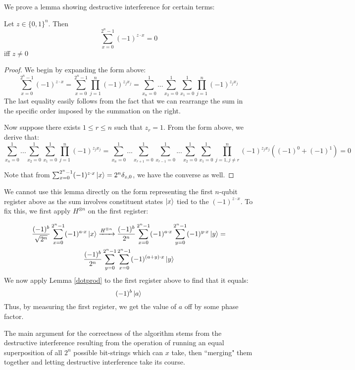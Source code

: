 \documentclass{../quantum.tex}
\begin{document}
We prove a lemma showing destructive interference for certain terms: \newline

\begin{lemma} \label{dotprod}
  Let $z \in \{0,1\}^n$. Then
  $$\sum_{x=0}^{2^n-1} (-1)^{z \cdot x} = 0$$ iff $z \neq 0$
\end{lemma}
\begin{proof}
   We begin by expanding the form above:
   $$\sum_{x=0}^{2^n-1} (-1)^{z \cdot x} = \sum_{x=0}^{2^n -1}\prod_{j=1}^n (-1)^{z_jx_j} = \sum_{x_n = 0}^1...\sum_{x_2 = 0}^1\sum_{x_1 = 0}^1 \prod_{j=1}^n (-1)^{z_jx_j}   $$
   The last equality easily follows from the fact that we can rearrange the sum in the specific order imposed by the summation on the right.

   Now suppose there exists $1 \leq r \leq n$ such that $z_r = 1$. From the form above, we derive that:
   $$\sum_{x_n = 0}^1...\sum_{x_2 = 0}^1\sum_{x_1 = 0}^1 \prod_{j=1}^n (-1)^{z_jx_j} = \sum_{x_n = 0}^1...\sum_{x_{r+1} = 0}^1\sum_{x_{r-1} = 0}^1... \sum_{x_2 = 0}^1\sum_{x_1 = 0}^1 \prod_{j=1,j \neq r}^n (-1)^{z_jx_j} ((-1)^0 + (-1)^1) = 0 $$

   Note that from $\sum_{x=0}^{2^n-1} (-1)^{z \cdot x} \ket{x} = 2^n\delta_{z,0}$, we have the converse as well.
\end{proof}

We cannot use this lemma directly on the form representing the first $n$-qubit register above as the sum involves constituent states $\ket{x}$ tied to the $(-1)^{z\cdot x}$. To fix this, we first apply $H^{\otimes n}$ on the first register:

\begin{gather}
  \frac{(-1)^b}{\sqrt{2^n}} \sum_{x=0}^{2^n-1}(-1)^{a\cdot x}\ket{x} \xrightarrow{H^{\otimes n}} \frac{(-1)^b}{2^n}\sum_{x=0}^{2^n -1}  (-1)^{a\cdot x} \sum_{y=0}^{2^n -1} (-1)^{y \cdot x} \ket{y} = \\
  \frac{(-1)^b}{2^n}\sum_{y=0}^{2^n -1} \sum_{x=0}^{2^n -1} (-1)^{(a+y)\cdot x} \ket{y}
\end{gather}
%
We now apply Lemma \ref{dotprod} to the first register above to find that it equals:
$$(-1)^b \ket{a} $$ Thus, by measuring the first register, we get the value of $a$ off by some phase factor.

The main argument for the correctness of the algorithm stems from the destructive interference resulting from the operation of running an equal superposition of all $2^n$ possible bit-strings which can $x$ take, then ``merging" them together and letting destructive interference take its course.
\end{document}
